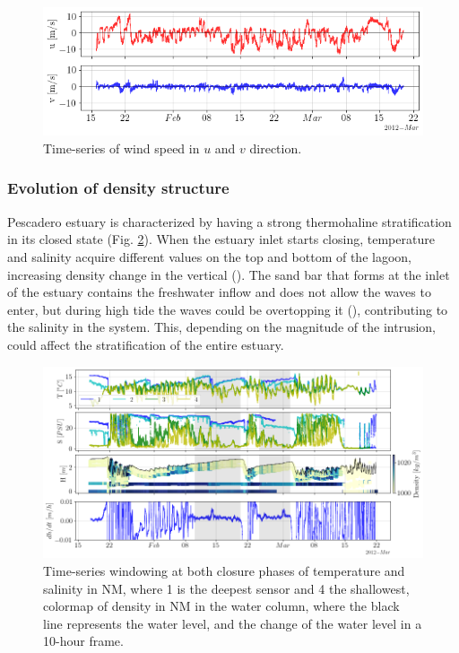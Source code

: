 \documentclass[11pt,letterpaper]{article}
\begin{document}
\begin{figure}[h!]
    \centering
    \includegraphics[width=\textwidth]{Imagenes/wind_vel.png}
    \caption{Time-series of wind speed in $u$ and $v$ direction.}
    \label{fig:windvel}
\end{figure}

\subsubsection{Evolution of density structure}

Pescadero estuary is characterized by having a strong thermohaline stratification in its closed state (Fig. \ref{fig:saltemp}). When the estuary inlet starts closing, temperature and salinity acquire different values on the top and bottom of the lagoon, increasing density change in the vertical (\cite{largier2015}). The sand bar that forms at the inlet of the estuary contains the freshwater inflow and does not allow the waves to enter, but during high tide the waves could be overtopping it (\cite{laudier2011measured}), contributing to the salinity in the system. This, depending on the magnitude of the intrusion, could affect the stratification of the entire estuary.\\

\begin{figure}[h!]
    \centering
    \includegraphics[scale=0.5]{Imagenes/saltemp.png}
    \caption{Time-series windowing at both closure phases of temperature and salinity in NM, where 1 is the deepest sensor and 4 the shallowest, colormap of density in NM in the water column, where the black line represents the water level, and the change of the water level in a 10-hour frame.}
    \label{fig:saltemp}
\end{figure}
\end{document}
